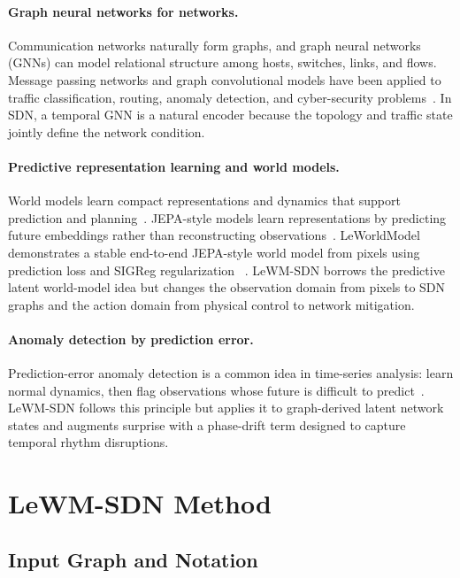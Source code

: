 \documentclass[runningheads]{llncs}
\begin{document}
\paragraph{Graph neural networks for networks.}
Communication networks naturally form graphs, and graph neural networks (GNNs)
can model relational structure among hosts, switches, links, and flows.
Message passing networks and graph convolutional models have been applied to
traffic classification, routing, anomaly detection, and cyber-security
problems~\cite{kipf2017gcn,velickovic2018gat,wu2021gnn_survey,zhang2022gnn_ids}. In SDN, a temporal GNN is a natural encoder because the
topology and traffic state jointly define the network condition.

\paragraph{Predictive representation learning and world models.}
World models learn compact representations and dynamics that support
prediction and planning~\cite{ha2018worldmodels,hafner2019planet,hafner2020dreamer}. JEPA-style models learn representations by predicting
future embeddings rather than reconstructing observations~\cite{lecun2022jepa,bardes2024ijepa}. LeWorldModel demonstrates a stable end-to-end JEPA-style
world model from pixels using prediction loss and SIGReg regularization
~\cite{maes2026lewm}. LeWM-SDN borrows the predictive latent world-model idea
but changes the observation domain from pixels to SDN graphs and the action
domain from physical control to network mitigation.

\paragraph{Anomaly detection by prediction error.}
Prediction-error anomaly detection is a common idea in time-series analysis:
learn normal dynamics, then flag observations whose future is difficult to
predict~\cite{chandola2009anomaly,ahmad2017unsupervised,malhotra2015lstm}.
LeWM-SDN follows this principle but applies it to graph-derived latent network
states and augments surprise with a phase-drift term designed to capture
temporal rhythm disruptions.

\section{LeWM-SDN Method}

\subsection{Input Graph and Notation}
\end{document}
